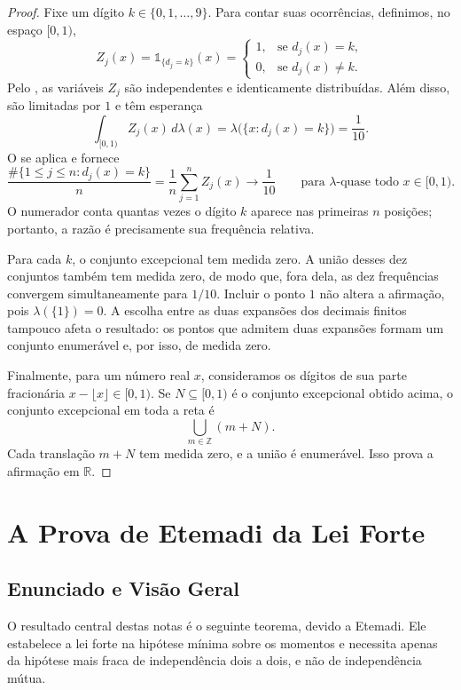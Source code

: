 \documentclass[12pt,portuguese]{article}
\theoremstyle{definition}
\theoremstyle{plainexercise}
\theoremstyle{starredexercise}
\theoremstyle{definition}
\begin{document}
\begin{proof}
Fixe um dígito $k\in\{0,1,\ldots,9\}$. Para contar suas ocorrências,
definimos, no espaço $[0,1)$,
\[
Z_j(x)=\mathds{1}_{\{d_j=k\}}(x)
=\begin{cases}
1,&\text{se }d_j(x)=k,\\
0,&\text{se }d_j(x)\neq k.
\end{cases}
\]
Pelo , as variáveis $Z_j$ são independentes e
identicamente distribuídas. Além disso, são limitadas por $1$ e têm esperança
\[
\int_{[0,1)}Z_j(x)\,d\lambda(x)
=\lambda\bigl(\{x:d_j(x)=k\}\bigr)=\frac{1}{10}.
\]
O  se aplica e fornece
\[
\frac{\#\{1\leqslant j\leqslant n:d_j(x)=k\}}{n}
=\frac{1}{n}\sum_{j=1}^{n}Z_j(x)
\longrightarrow\frac{1}{10}
\qquad\text{para $\lambda$-quase todo }x\in[0,1).
\]
O numerador conta quantas vezes o dígito $k$ aparece nas primeiras $n$
posições; portanto, a razão é precisamente sua frequência relativa.

Para cada $k$, o conjunto excepcional tem medida zero. A união desses dez
conjuntos também tem medida zero, de modo que, fora dela, as dez frequências
convergem simultaneamente para $1/10$. Incluir o ponto $1$ não altera a
afirmação, pois $\lambda(\{1\})=0$. A escolha entre as duas expansões dos
decimais finitos tampouco afeta o resultado: os pontos que admitem duas
expansões formam um conjunto enumerável e, por isso, de medida zero.

Finalmente, para um número real $x$, consideramos os dígitos de sua parte
fracionária $x-\lfloor x\rfloor\in[0,1)$. Se $N\subseteq[0,1)$ é o conjunto
excepcional obtido acima, o conjunto excepcional em toda a reta é
\[
\bigcup_{m\in\mathbb{Z}}(m+N).
\]
Cada translação $m+N$ tem medida zero, e a união é enumerável. Isso prova a
afirmação em $\mathbb{R}$.
\end{proof}

\section{A Prova de Etemadi da Lei Forte}\label{sec:etemadi}

\subsection{Enunciado e Visão Geral}\label{subsec:etemadi-enunciado}

O resultado central destas notas é o seguinte teorema, devido a Etemadi. Ele
estabelece a lei forte na hipótese mínima sobre os momentos e necessita apenas
da hipótese mais fraca de independência dois a dois, e não de independência
mútua.
\end{document}
